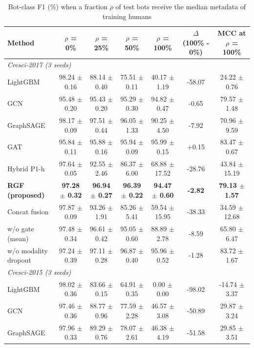 \begin{table}[!t]
\centering
\caption{Bot-class F1 (\%) when a fraction $\rho$ of test bots receive the median metadata of training humans}
\label{tab:metadata_mimicry}
\scriptsize
\setlength{\tabcolsep}{3pt}
\begin{tabular}{lcccccc}
\hline
\textbf{Method} & \textbf{$\rho$ = 0\%} & \textbf{$\rho$ = 25\%} & \textbf{$\rho$ = 50\%} & \textbf{$\rho$ = 100\%} & \textbf{$\Delta$ (100\% - 0\%)} & \textbf{MCC at $\rho$ = 100\%} \\
\hline
\multicolumn{7}{l}{\textit{Cresci-2017 (3 seeds)}} \\
LightGBM & 98.24 $\pm$ 0.16 & 88.14 $\pm$ 0.40 & 75.51 $\pm$ 0.11 & 40.17 $\pm$ 1.19 & -58.07 & 24.22 $\pm$ 0.76 \\
GCN & 95.48 $\pm$ 0.20 & 95.43 $\pm$ 0.20 & 95.29 $\pm$ 0.30 & 94.82 $\pm$ 0.47 & -0.65 & 79.57 $\pm$ 1.48 \\
GraphSAGE & 98.17 $\pm$ 0.09 & 97.51 $\pm$ 0.44 & 96.05 $\pm$ 1.33 & 90.25 $\pm$ 4.50 & -7.92 & 70.96 $\pm$ 9.59 \\
GAT & 95.84 $\pm$ 0.11 & 95.88 $\pm$ 0.16 & 95.94 $\pm$ 0.09 & 95.99 $\pm$ 0.15 & +0.15 & 83.47 $\pm$ 0.67 \\
Hybrid P1-h & 97.64 $\pm$ 0.05 & 92.55 $\pm$ 2.46 & 86.37 $\pm$ 6.00 & 68.88 $\pm$ 17.52 & -28.76 & 43.84 $\pm$ 15.19 \\
\textbf{RGF (proposed)} & \textbf{97.28 $\pm$ 0.32} & \textbf{96.94 $\pm$ 0.27} & \textbf{96.39 $\pm$ 0.22} & \textbf{94.47 $\pm$ 0.60} & \textbf{-2.82} & \textbf{79.13 $\pm$ 1.57} \\
Concat fusion & 97.87 $\pm$ 0.09 & 93.26 $\pm$ 1.91 & 85.26 $\pm$ 5.41 & 59.54 $\pm$ 15.95 & -38.33 & 34.59 $\pm$ 12.68 \\
w/o gate (mean) & 97.48 $\pm$ 0.34 & 96.61 $\pm$ 0.42 & 95.05 $\pm$ 0.60 & 88.89 $\pm$ 2.78 & -8.59 & 65.80 $\pm$ 6.47 \\
w/o modality dropout & 97.24 $\pm$ 0.39 & 97.11 $\pm$ 0.28 & 96.87 $\pm$ 0.40 & 95.96 $\pm$ 0.52 & -1.28 & 83.72 $\pm$ 1.67 \\
\multicolumn{7}{l}{\textit{Cresci-2015 (3 seeds)}} \\
LightGBM & 98.02 $\pm$ 0.36 & 83.66 $\pm$ 0.15 & 64.91 $\pm$ 0.35 & 0.00 $\pm$ 0.00 & -98.02 & -14.74 $\pm$ 3.37 \\
GCN & 97.46 $\pm$ 0.36 & 88.77 $\pm$ 0.96 & 77.59 $\pm$ 2.28 & 46.57 $\pm$ 3.08 & -50.89 & 29.87 $\pm$ 3.24 \\
GraphSAGE & 97.96 $\pm$ 0.33 & 89.29 $\pm$ 0.76 & 78.07 $\pm$ 2.61 & 46.38 $\pm$ 4.19 & -51.58 & 29.85 $\pm$ 3.51 \\

\end{tabular}
\end{table}
